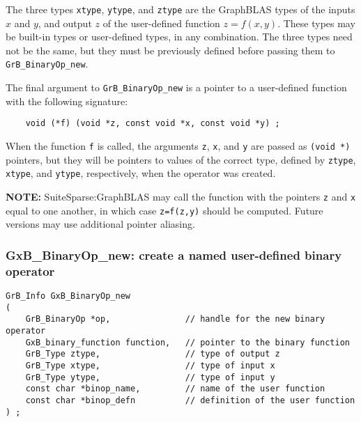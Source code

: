 \documentclass[12pt]{article}
\begin{document}
The three types \verb'xtype', \verb'ytype', and \verb'ztype' are the GraphBLAS
types of the inputs $x$ and $y$, and output $z$ of the user-defined function
$z=f(x,y)$.  These types may be built-in types or user-defined types, in any
combination.  The three types need not be the same, but they must be previously
defined before passing them to \verb'GrB_BinaryOp_new'.

The final argument to \verb'GrB_BinaryOp_new' is a pointer to a user-defined
function with the following signature:

    {\footnotesize
    \begin{verbatim}
    void (*f) (void *z, const void *x, const void *y) ; \end{verbatim} }

When the function \verb'f' is called, the arguments \verb'z', \verb'x', and
\verb'y' are passed as \verb'(void *)' pointers, but they will be pointers to
values of the correct type, defined by \verb'ztype', \verb'xtype', and
\verb'ytype', respectively, when the operator was created.

{\bf NOTE:} SuiteSparse:GraphBLAS may call the function with the pointers
\verb'z' and \verb'x' equal to one another, in which case \verb'z=f(z,y)'
should be computed.  Future versions may use additional pointer aliasing.

\newpage
\subsubsection{{\sf GxB\_BinaryOp\_new:} create a named user-defined binary operator}
\label{binaryop_new_named}

\begin{mdframed}[userdefinedwidth=6in]
{\footnotesize
\begin{verbatim}
GrB_Info GxB_BinaryOp_new
(
    GrB_BinaryOp *op,               // handle for the new binary operator
    GxB_binary_function function,   // pointer to the binary function
    GrB_Type ztype,                 // type of output z
    GrB_Type xtype,                 // type of input x
    GrB_Type ytype,                 // type of input y
    const char *binop_name,         // name of the user function
    const char *binop_defn          // definition of the user function
) ;
\end{verbatim} }\end{mdframed}
\end{document}
